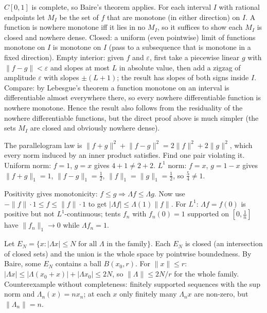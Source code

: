 \documentclass[11pt,a4paper]{article}
\begin{document}

\(C[0,1]\) is complete, so Baire's theorem applies. For each interval \(I\) with rational endpoints let \(M_I\) be the set of \(f\) that are monotone (in either direction) on \(I\). A function is nowhere monotone iff it lies in no \(M_I\), so it suffices to show each \(M_I\) is closed and nowhere dense.
Closed: a uniform (even pointwise) limit of functions monotone on \(I\) is monotone on \(I\) (pass to a subsequence that is monotone in a fixed direction). Empty interior: given \(f\) and \(\varepsilon\), first take a piecewise linear \(g\) with \(\lVert f-g\rVert\lt\varepsilon\) and slopes at most \(L\) in absolute value, then add a zigzag of amplitude \(\varepsilon\) with slopes \(\pm(L+1)\); the result has slopes of both signs inside \(I\).
Compare: by Lebesgue's theorem a function monotone on an interval is differentiable almost everywhere there, so every nowhere differentiable function is nowhere monotone. Hence the result also follows from the residuality of the nowhere differentiable functions, but the direct proof above is much simpler (the sets \(M_I\) are closed and obviously nowhere dense).

The parallelogram law is \(\lVert f+g\rVert^2+\lVert f-g\rVert^2=2\lVert f\rVert^2+2\lVert g\rVert^2\), which every norm induced by an inner product satisfies. Find one pair violating it.
Uniform norm: \(f=1\), \(g=x\) gives \(4+1\ne2+2\). \(L^1\) norm: \(f=x\), \(g=1-x\) gives \(\lVert f+g\rVert_1=1\), \(\lVert f-g\rVert_1=\frac12\), \(\lVert f\rVert_1=\lVert g\rVert_1=\frac12\), so \(\frac54\ne1\).

Positivity gives monotonicity: \(f\le g\Rightarrow\Lambda f\le\Lambda g\). Now use \(-\lVert f\rVert\cdot1\le f\le\lVert f\rVert\cdot1\) to get \(\lvert\Lambda f\rvert\le\Lambda(1)\lVert f\rVert\).
For \(L^1\): \(\Lambda f=f(0)\) is positive but not \(L^1\)-continuous; tents \(f_n\) with \(f_n(0)=1\) supported on \([0,\frac1n]\) have \(\lVert f_n\rVert_1\to0\) while \(\Lambda f_n=1\).

Let \(E_N=\{x:\lvert\Lambda x\rvert\le N\text{ for all }\Lambda\text{ in the family}\}\). Each \(E_N\) is closed (an intersection of closed sets) and the union is the whole space by pointwise boundedness. By Baire, some \(E_N\) contains a ball \(B(x_0,r)\).
For \(\lVert x\rVert\le r\): \(\lvert\Lambda x\rvert\le\lvert\Lambda(x_0+x)\rvert+\lvert\Lambda x_0\rvert\le2N\), so \(\lVert\Lambda\rVert\le2N/r\) for the whole family. Counterexample without completeness: finitely supported sequences with the sup norm and \(\Lambda_n(x)=nx_n\); at each \(x\) only finitely many \(\Lambda_n x\) are non-zero, but \(\lVert\Lambda_n\rVert=n\).
\end{document}
